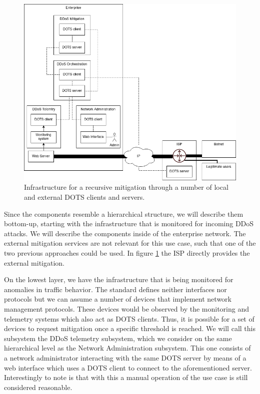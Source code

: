 \begin{figure}
    \centering
    \includegraphics[width=13cm]{Seminar-Template/Talk7/images/ddos-orchestration.png}
    \caption{Infrastructure for a recursive mitigation through a number of local and external DOTS clients and servers.}
    \label{fig:ddos-orchestration}
\end{figure}{}

Since the components resemble a hierarchical structure, we will describe them bottom-up, starting with the infrastructure that is monitored for incoming DDoS attacks. We will describe the components inside of the enterprise network. The external mitigation services are not relevant for this use case, such that one of the two previous approaches could be used. In figure \ref{fig:ddos-orchestration} the ISP directly provides the external mitigation.

On the lowest layer, we have the infrastructure that is being monitored for anomalies in traffic behavior. The standard defines neither interfaces nor protocols but we can assume a number of devices that implement network management protocols. These devices would be observed by the monitoring and telemetry systems which also act as DOTS clients. Thus, it is possible for a set of devices to request mitigation once a specific threshold is reached. We will call this subsystem the DDoS telemetry subsystem, which we consider on the same hierarchical level as the Network Administration subsystem. This one consists of a network administrator interacting with the same DOTS server by means of a web interface which uses a DOTS client to connect to the aforementioned server. Interestingly to note is that with this a manual operation of the use case is still considered reasonable.

